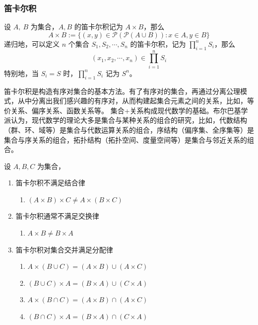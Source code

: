 \subsubsection*{笛卡尔积}

\begin{definition}
    设 $ A,\ B $ 为集合，$ A,B $ 的笛卡尔积记为 $ A\times B $，那么
    \[
        A\times B := \{(x,y)\in \mathcal{P}(\mathcal{P}(A\cup B)):x\in A,y\in B\} 
    \]
    递归地，可以定义 $n$ 个集合 $S_1,S_2,\cdots,S_n$ 的笛卡尔积，记为 $\prod^n_{i=1}S_i$，那么
    \[
        (x_1,x_2,\cdots,x_n) \in \prod^n_{i=1}S_i
    \]
    特别地，当 $ S_i = S $ 时，$ \prod^n_{i=1}S_i $ 记为 $ S^n $。
\end{definition}


\begin{note}
    笛卡尔积是构造有序对集合的基本方法。有了有序对的集合，再通过分离公理模式，从中分离出我们感兴趣的有序对，从而构建起集合元素之间的关系，比如，等价关系、偏序关系、函数关系等。
    集合+关系构成现代数学的基础。布尔巴基学派认为，现代数学的理论大多是集合与某种关系的组合的研究，比如，代数结构（群、环、域等）是集合与代数运算关系的组合，序结构（偏序集、全序集等）是集合与序关系的组合，拓扑结构（拓扑空间、度量空间等）是集合与邻近关系的组合。
\end{note}
\vspace{1em}

\begin{proposition}[笛卡尔积的性质]
    设 $A, B, C$ 为集合，
    \begin{enumerate}
        \item 笛卡尔积不满足结合律
        \begin{enumerate}
            \item $(A\times B)\times C \neq A\times (B\times C)$
        \end{enumerate}
        \item 笛卡尔积通常不满足交换律
        \begin{enumerate}
            \item $A\times B \neq B\times A$
        \end{enumerate}
        \item 笛卡尔积对集合交并满足分配律
        \begin{enumerate}
            \item $A \times(B \cup C)=(A \times B) \cup(A \times C)$
            \item $(B \cup C) \times A=(B \times A) \cup(C \times A)$
            \item $A \times(B \cap C)=(A \times B) \cap(A \times C) $
            \item $(B \cap C) \times A=(B \times A) \cap(C \times A)$
        \end{enumerate}
    \end{enumerate}
\end{proposition}
\vspace{1em}

